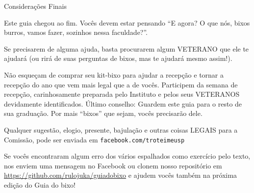 \begin{secao}{Considerações Finais}

Este guia chegou ao fim. Vocês devem estar pensando ``E agora? O que nós, bixos
burros, vamos fazer, sozinhos nessa faculdade?''.

Se precisarem de alguma ajuda, basta procurarem algum VETERANO que ele te
ajudará (ou rirá de suas perguntas de bixos, mas te ajudará mesmo assim!).

Não esqueçam de comprar seu kit-bixo para ajudar a recepção e tornar a recepção
do ano que vem mais legal que a de vocês. Participem da semana de recepção,
carinhosamente preparada pelo Instituto e pelos seus VETERANOS devidamente
identificados. Último conselho: Guardem este guia para o resto de sua graduação.
Por mais ``bixos'' que sejam, vocês precisarão dele.

Qualquer sugestão, elogio, presente, bajulação e outras coisas LEGAIS para a
Comissão, pode ser enviada em {\tt facebook.com/troteimeusp}

Se vocês encontraram algum erro dos vários espalhados como exercício pelo texto,
nos enviem uma mensagem no Facebook ou clonem nosso repositório em
\url{https://github.com/rulojuka/guiadobixo} e ajudem vocês também na próxima
edição do Guia do bixo!

\end{secao}
